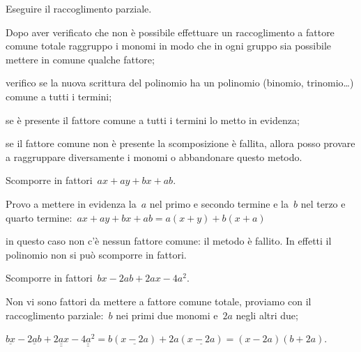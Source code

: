 \begin{procedura}
Eseguire il raccoglimento parziale.
\begin{enumeratea}
\item Dopo aver verificato che non è possibile effettuare un raccoglimento a 
 fattore comune totale raggruppo i monomi in modo che in ogni gruppo sia 
 possibile mettere in comune qualche fattore;
\item verifico se la nuova scrittura del polinomio ha un polinomio 
 (binomio, trinomio\ldots) comune a tutti i termini;
\item se è presente il fattore comune a tutti i termini lo metto in evidenza;
\item se il fattore comune non è presente la scomposizione è fallita, allora 
 posso provare a raggruppare diversamente i monomi o abbandonare questo metodo.
\end{enumeratea}
\end{procedura}

 \begin{esempio}
Scomporre in fattori~\(ax+ay+bx+ab\).
  \begin{enumeratea}
  \item Provo a mettere in evidenza la~\(a\) nel primo e secondo termine e 
   la~\(b\) nel terzo e quarto termine:~\(ax+ay+bx+ab=a(x+y)+b(x+a)\)
  \item in questo caso non c'è nessun fattore comune: il metodo è fallito. 
   In effetti il polinomio non si può scomporre in fattori.
  \end{enumeratea}
 \end{esempio}

 \begin{esempio}
Scomporre in fattori~\(bx-2ab+2ax-4a^{2}\).
 \begin{enumeratea}
 \item Non vi sono fattori da mettere a fattore comune totale, proviamo con 
  il raccoglimento parziale:~\(b\) nei primi due monomi e~\(2a\) negli altri due;
 \item \(\underline{bx} -\underline{2ab}+\underline{\underline{2ax}}-
        \underline{\underline{4a^{2}}}=
        b(\underline{x-2a})+2a(\underline{x-2a})=(x-2a)(b+2a)\).
 \end{enumeratea}
 \end{esempio}

